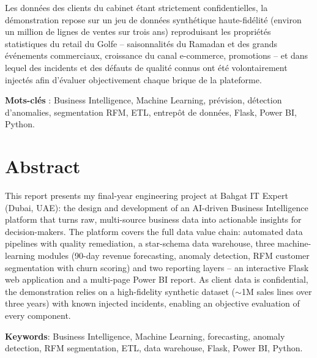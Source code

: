 \documentclass[12pt,a4paper]{report}
\begin{document}
Les données des clients du cabinet étant strictement confidentielles, la
démonstration repose sur un jeu de données synthétique haute-fidélité
(environ un million de lignes de ventes sur trois ans) reproduisant les
propriétés statistiques du retail du Golfe -- saisonnalités du Ramadan et des
grands événements commerciaux, croissance du canal e-commerce, promotions --
et dans lequel des incidents et des défauts de qualité connus ont été
volontairement injectés afin d'évaluer objectivement chaque brique de la
plateforme.

\vspace{0.5em}
\noindent\textbf{Mots-clés} : Business Intelligence, Machine Learning,
prévision, détection d'anomalies, segmentation RFM, ETL, entrepôt de données,
Flask, Power BI, Python.

\section*{Abstract}
This report presents my final-year engineering project at Bahgat IT Expert
(Dubai, UAE): the design and development of an AI-driven Business Intelligence
platform that turns raw, multi-source business data into actionable insights
for decision-makers. The platform covers the full data value chain: automated
data pipelines with quality remediation, a star-schema data warehouse, three
machine-learning modules (90-day revenue forecasting, anomaly detection, RFM
customer segmentation with churn scoring) and two reporting layers -- an
interactive Flask web application and a multi-page Power BI report. As client
data is confidential, the demonstration relies on a high-fidelity synthetic
dataset ($\sim$1M sales lines over three years) with known injected incidents,
enabling an objective evaluation of every component.

\vspace{0.5em}
\noindent\textbf{Keywords}: Business Intelligence, Machine Learning,
forecasting, anomaly detection, RFM segmentation, ETL, data warehouse, Flask,
Power BI, Python.

\tableofcontents
\listoffigures
{}

\end{document}
